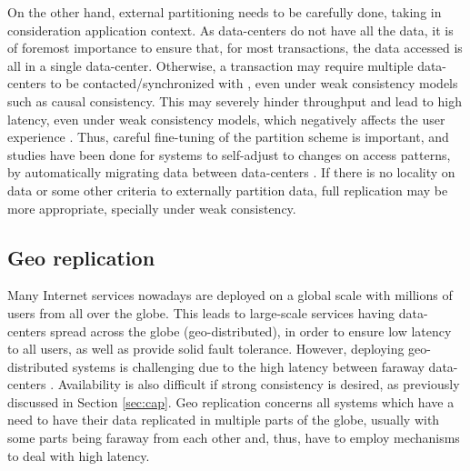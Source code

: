 On the other hand, external partitioning needs to be carefully done, taking in consideration application context.
As data-centers do not have all the data, it is of foremost importance to ensure that, for most transactions, the data accessed is all in a single data-center.
Otherwise, a transaction may require multiple data-centers to be contacted/synchronized with \cite{spanner, sipre, chronocache, slog}, even under weak consistency models such as causal consistency.
This may severely hinder throughput and lead to high latency, even under weak consistency models, which negatively affects the user experience \cite{eiger, mdcc}.
Thus, careful fine-tuning of the partition scheme is important, and studies have been done for systems to self-adjust to changes on access patterns, by automatically migrating data between data-centers \cite{slog}.
If there is no locality on data or some other criteria to externally partition data, full replication may be more appropriate, specially under weak consistency.



\subsection{Geo replication}
\label{subsec:geo}


Many Internet services nowadays are deployed on a global scale with millions of users from all over the globe.
This leads to large-scale services having data-centers spread across the globe (geo-distributed), in order to ensure low latency to all users, as well as provide solid fault tolerance.
However, deploying geo-distributed systems is challenging due to the high latency between faraway data-centers \cite{mdcc, eiger, chronocache, slog}. Availability is also difficult if strong consistency is desired, as previously discussed in Section \ref{sec:cap}.
Geo replication concerns all systems which have a need to have their data replicated in multiple parts of the globe, usually with some parts being faraway from each other and, thus, have to employ mechanisms to deal with high latency.

